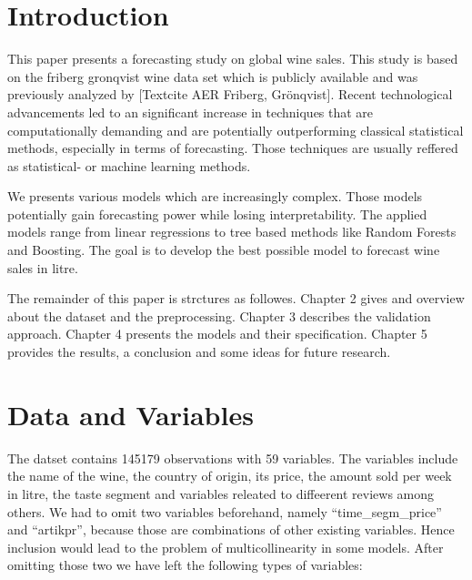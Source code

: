 \documentclass[11pt,]{article}
\begin{document}
{
\hypersetup{linkcolor=black}
\setcounter{tocdepth}{3}
\tableofcontents
}
\newpage
\listoftables
\newpage
\listoffigures
\newpage
{} 
\hypertarget{introduction}{%
\section{Introduction}\label{introduction}}

This paper presents a forecasting study on global wine sales. This study
is based on the friberg gronqvist wine data set which is publicly
available and was previously analyzed by {[}Textcite AER Friberg,
Grönqvist{]}. Recent technological advancements led to an significant
increase in techniques that are computationally demanding and are
potentially outperforming classical statistical methods, especially in
terms of forecasting. Those techniques are usually reffered as
statistical- or machine learning methods.

We presents various models which are increasingly complex. Those models
potentially gain forecasting power while losing interpretability. The
applied models range from linear regressions to tree based methods like
Random Forests and Boosting. The goal is to develop the best possible
model to forecast wine sales in litre.

The remainder of this paper is strctures as followes. Chapter 2 gives
and overview about the dataset and the preprocessing. Chapter 3
describes the validation approach. Chapter 4 presents the models and
their specification. Chapter 5 provides the results, a conclusion and
some ideas for future research.

\hypertarget{data-and-variables}{%
\section{Data and Variables}\label{data-and-variables}}

The datset contains 145179 observations with 59 variables. The variables
include the name of the wine, the country of origin, its price, the
amount sold per week in litre, the taste segment and variables releated
to diffeerent reviews among others. We had to omit two variables
beforehand, namely \enquote{time\_segm\_price} and \enquote{artikpr},
because those are combinations of other existing variables. Hence
inclusion would lead to the problem of multicollinearity in some models.
After omitting those two we have left the following types of variables:
\end{document}
